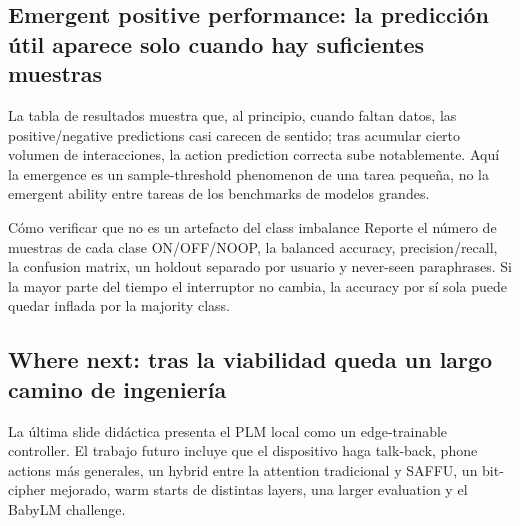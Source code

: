 \subsection{Emergent positive performance: la predicción útil aparece solo cuando hay suficientes muestras}

La tabla de resultados muestra que, al principio, cuando faltan datos, las positive/negative predictions casi carecen de sentido; tras acumular cierto volumen de interacciones, la action prediction correcta sube notablemente. Aquí la emergence es un sample-threshold phenomenon de una tarea pequeña, no la emergent ability entre tareas de los benchmarks de modelos grandes.


\begin{importantbox}{Cómo verificar que no es un artefacto del class imbalance}
Reporte el número de muestras de cada clase ON/OFF/NOOP, la balanced accuracy, precision/recall, la confusion matrix, un holdout separado por usuario y never-seen paraphrases. Si la mayor parte del tiempo el interruptor no cambia, la accuracy por sí sola puede quedar inflada por la majority class.
\end{importantbox}


\subsection{Where next: tras la viabilidad queda un largo camino de ingeniería}

La última slide didáctica presenta el PLM local como un edge-trainable controller. El trabajo futuro incluye que el dispositivo haga talk-back, phone actions más generales, un hybrid entre la attention tradicional y SAFFU, un bit-cipher mejorado, warm starts de distintas layers, una larger evaluation y el BabyLM challenge.


